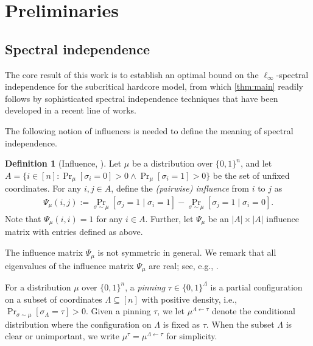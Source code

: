 \documentclass[11pt]{article}
\theoremstyle{plain}
\theoremstyle{definition}
\newtheorem{definition}[theorem]{Definition}
\theoremstyle{remark}
\def\oPr{\mathop{\mathrm{Pr}}}
\renewcommand{\Pr}[2][]{
  \oPr_{#1}\left[#2\right] } %
\begin{document}
\section{Preliminaries}
\label{sec:pre}

\subsection{Spectral independence}
\label{subsec:SI}
The core result of this work is to establish an optimal bound on the $\ell_\infty$-spectral independence for the subcritical hardcore model, from which \cref{thm:main} readily follows by sophisticated spectral independence techniques that have been developed in a recent line of works.


The following notion of influences is needed to define the meaning of spectral independence. 
\begin{definition}[Influence, \cite{anari2020spectral}]
	Let $\mu$ be a distribution over $\{0,1\}^n$, and let $A = \{i \in [n]: \Pr[\mu]{\sigma_i = 0} > 0 \land \Pr[\mu]{\sigma_i = 1} > 0\}$ be the set of unfixed coordinates.
	For any $i,j \in A$, define the \emph{(pairwise) influence} from $i$ to $j$ as
	\begin{align*}
		\Psi_\mu(i,j) := \Pr[\sigma\sim\mu]{\sigma_j = 1 \mid \sigma_i = 1} - \Pr[\sigma\sim\mu]{\sigma_j = 1 \mid \sigma_i = 0}.
	\end{align*}
	Note that $\Psi_\mu(i,i)=1$ for any $i \in A$.
	Further, let $\Psi_\mu$ be an $|A| \times |A|$ influence matrix with entries defined as above.
\end{definition}

The influence matrix $\Psi_\mu$ is not symmetric in general.
We remark that all eigenvalues of the influence matrix $\Psi_\mu$ are real; see, e.g., \cite{anari2020spectral}.


For a distribution $\mu$ over $\{0,1\}^n$, a \emph{pinning} $\tau \in \{0,1\}^\Lambda$ is a partial configuration on a subset of coordinates $\Lambda \subseteq [n]$ with positive density, i.e., $\Pr[\sigma\sim\mu]{\sigma_\Lambda = \tau}>0$.
Given a pinning $\tau$, we let $\mu^{\Lambda \gets \tau}$ denote the conditional distribution where the configuration on $\Lambda$ is fixed as $\tau$.
When the subset $\Lambda$ is clear or unimportant, we write $\mu^\tau = \mu^{\Lambda \gets \tau}$ for simplicity.
\end{document}
